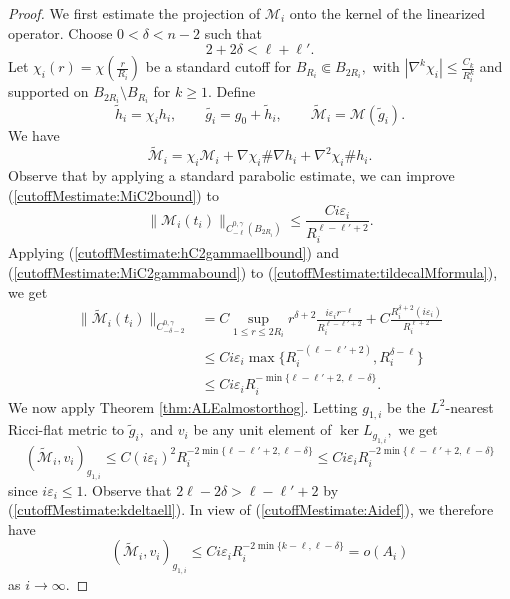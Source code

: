 \documentclass[12pt]{amsart}
\newcommand{\calM}{\mathcal{M}}
\renewcommand{\1}{{\mathbf 1}}
\newcommand{\eps}{{\varepsilon}}
\theoremstyle{others}
\numberwithin{equation}{section}
\begin{document}
\begin{proof}
    
    We first estimate the projection of $\calM_i$ onto the kernel of the linearized operator. Choose $0 < \delta < n - 2$ %
such that
\begin{equation}\label{cutoffMestimate:kdeltaell}
2 + 2 \delta < \ell + \ell'.
\end{equation}
Let $\chi_i(r) = \chi\left( \frac{r}{ R_i } \right)$ be a standard cutoff for $B_{R_i} \Subset B_{2 R_i},$ with $|\nabla^k \chi_i| \leq \frac{C_k}{ R_i^{k} }$ and supported on $B_{2 R_i} \setminus B_{R_i}$ for $k \geq 1.$ Define
$$\tilde{h}_i = \chi_i h_i, \qquad \tilde{g_i} = g_0 + \tilde{h}_i, \qquad \tilde{\calM}_i = \calM(\tilde{g}_i).$$
We have
\begin{equation}\label{cutoffMestimate:tildecalMformula}
    \tilde{\calM}_i = \chi_i \calM_i + \nabla \chi_i \# \nabla h_i + \nabla^2 \chi_i \# h_i.
\end{equation}
Observe that by applying a standard parabolic estimate, we can improve (\ref{cutoffMestimate:MiC2bound}) to
    \begin{equation}\label{cutoffMestimate:MiC2gammabound}
        \| \calM_i(t_i) \|_{C_{-\ell}^{0,\gamma} \left( B_{2R_i} \right) } \leq \frac{C i \eps_i}{R_i^{\ell - \ell' + 2} }.
    \end{equation}
    Applying (\ref{cutoffMestimate:hC2gammaellbound}) and (\ref{cutoffMestimate:MiC2gammabound}) to (\ref{cutoffMestimate:tildecalMformula}), we get
    \begin{equation}\label{cutoffMestimate:Mideltaest}
    \begin{split}
        \| \tilde{\calM}_i(t_i) \|_{C_{-\delta - 2}^{0,\gamma} } & = C \sup_{1 \leq r \leq 2R_i} r^{\delta + 2} \frac{i\eps_i r^{-\ell}}{R_i^{\ell - \ell' + 2}} + C \frac{ R_i^{\delta + 2} (i\eps_i)}{ R_i^{\ell + 2} } \\
        & \leq C i \eps_i \max\{ R_i^{-(\ell - \ell' + 2)}, R_i^{\delta - \ell} \} \\
        & \leq C i \eps_i R_i^{-\min \{\ell - \ell' + 2, \ell - \delta \}}.
        \end{split}
    \end{equation}
    We now apply Theorem \ref{thm:ALEalmostorthog}. Letting $g_{1,i}$ be the $L^2$-nearest Ricci-flat metric to $\tilde{g}_i,$ and $v_i$ be any unit element of $\ker L_{g_{1,i}},$ we get
    \begin{equation}
        \left( \tilde{\calM}_i, v_i \right)_{g_{1,i}} \leq C (i \eps_i)^2 R_i^{-2 \min \{\ell - \ell' + 2, \ell - \delta \}} \leq C i \eps_i R_i^{-2 \min \{\ell - \ell' + 2, \ell - \delta \}}
    \end{equation}
    since $i \eps_i \leq 1.$ Observe that $2 \ell - 2 \delta > \ell - \ell' + 2$ by (\ref{cutoffMestimate:kdeltaell}). In view of (\ref{cutoffMestimate:Aidef}), we therefore have
    \begin{equation}\label{cutoffMestimate:almostorthog}
    \left( \tilde{\calM}_i, v_i \right)_{g_{1,i}} \leq C i \eps_i R_i^{-2 \min \{k - \ell, \ell - \delta \}} = o(A_i)
    \end{equation}
    as $i \to \infty.$


\end{proof}
\end{document}

